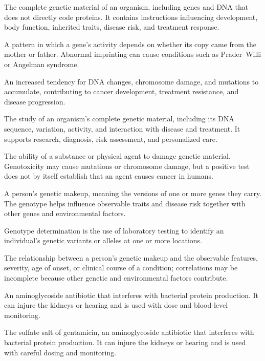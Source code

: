  The complete genetic material of an organism, including genes and DNA that does not directly code proteins. It contains instructions influencing development, body function, inherited traits, disease risk, and treatment response.

 A pattern in which a gene’s activity depends on whether its copy came from the mother or father. Abnormal imprinting can cause conditions such as Prader–Willi or Angelman syndrome.

 An increased tendency for DNA changes, chromosome damage, and mutations to accumulate, contributing to cancer development, treatment resistance, and disease progression.

 The study of an organism’s complete genetic material, including its DNA sequence, variation, activity, and interaction with disease and treatment. It supports research, diagnosis, risk assessment, and personalized care.

 The ability of a substance or physical agent to damage genetic material. Genotoxicity may cause mutations or chromosome damage, but a positive test does not by itself establish that an agent causes cancer in humans.

 A person’s genetic makeup, meaning the versions of one or more genes they carry. The genotype helps influence observable traits and disease risk together with other genes and environmental factors.

 Genotype determination is the use of laboratory testing to identify an individual's genetic variants or alleles at one or more locations.

 The relationship between a person’s genetic makeup and the observable features, severity, age of onset, or clinical course of a condition; correlations may be incomplete because other genetic and environmental factors contribute.

 An aminoglycoside antibiotic that interferes with bacterial protein production. It can injure the kidneys or hearing and is used with dose and blood-level monitoring.

 The sulfate salt of gentamicin, an aminoglycoside antibiotic that interferes with bacterial protein production. It can injure the kidneys or hearing and is used with careful dosing and monitoring.

